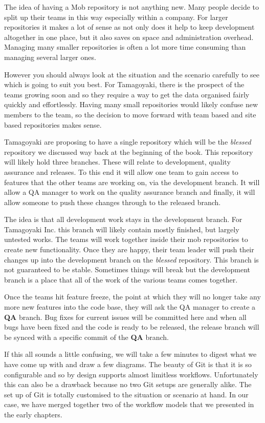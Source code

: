 The idea of having a Mob repository is not anything new.
Many people decide to split up their teams in this way especially within a company.
For larger repositories it makes a lot of sense as not only does it help to keep development altogether in one place, but it also saves on space and administration overhead.
Managing many smaller repositories is often a lot more time consuming than managing several larger ones.

However you should always look at the situation and the scenario carefully to see which is going to suit you best.
For Tamagoyaki, there is the prospect of the teams growing soon and so they require a way to get the data organised fairly quickly and effortlessly.
Having many small repositories would likely confuse new members to the team, so the decision to move forward with team based and site based repositories makes sense.

Tamagoyaki are proposing to have a single repository which will be the \emph{blessed} repository we discussed way back at the beginning of the book.
This repository will likely hold three branches.
These will relate to development, quality assurance and releases.
To this end it will allow one team to gain access to features that the other teams are working on, via the development branch.
It will allow a QA manager to work on the quality assurance branch and finally, it will allow someone to push these changes through to the released branch.

The idea is that all development work stays in the development branch.
For Tamagoyaki Inc.
this branch will likely contain mostly finished, but largely untested works.
The teams will work together inside their mob repositories to create new functionality.
Once they are happy, their team leader will push their changes up into the development branch on the \emph{blessed} repository.
This branch is not guaranteed to be stable.
Sometimes things will break but the development branch is a place that all of the work of the various teams comes together.

Once the teams hit feature freeze, the point at which they will no longer take any more new features into the code base, they will ask the QA manager to create a \textbf{QA} branch.
Bug fixes for current issues will be committed here and when all bugs have been fixed and the code is ready to be released, the release branch will be synced with a specific commit of the \textbf{QA} branch.

If this all sounds a little confusing, we will take a few minutes to digest what we have come up with and draw a few diagrams.
The beauty of Git is that it is so configurable and so by design supports almost limitless workflows.
Unfortunately this can also be a drawback because no two Git setups are generally alike.
The set up of Git is totally customised to the situation or scenario at hand.
In our case, we have merged together two of the workflow models that we presented in the early chapters.


